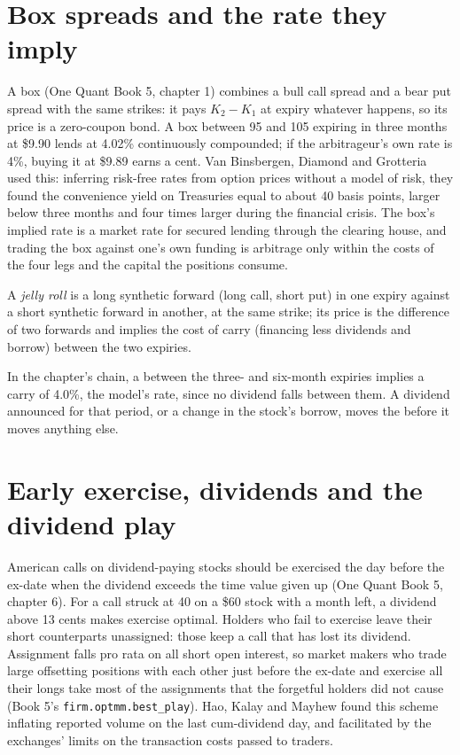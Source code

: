 \section{Box spreads and the rate they imply}

A box (One Quant Book 5, chapter 1) combines a bull call spread and a bear put spread with the same strikes: it pays $K_2-K_1$ at expiry whatever
happens, so its price is a zero-coupon bond. A box between 95 and 105 expiring in three months at \$9.90 lends at 4.02\% continuously compounded; if
the arbitrageur's own rate is 4\%, buying it at \$9.89 earns a cent. Van Binsbergen, Diamond and Grotteria used this: inferring risk-free rates from
option prices without a model of risk, they found the convenience yield on Treasuries equal to about 40 basis points, larger below three months and
four times larger during the financial crisis. The box's implied rate is a market rate for secured lending through the clearing house, and trading
the box against one's own funding is arbitrage only within the costs of the four legs and the capital the positions consume.

\begin{definition}\label{def:hf:options-cross-venue-and-volatility-arbitrage-at-speed:jelly}
A \emph{jelly roll} is a long synthetic forward (long call, short put) in one expiry against a short synthetic forward in another,
at the same strike; its price is the difference of two forwards and implies the cost of carry (financing less dividends and borrow) between the two
expiries.
\end{definition}

In the chapter's chain, a  between the three- and six-month expiries implies a carry of 4.0\%, the model's rate, since no dividend falls
between them. A dividend announced for that period, or a change in the stock's borrow, moves the  before it moves anything else.

\section{Early exercise, dividends and the dividend play}

American calls on dividend-paying stocks should be exercised the day before the ex-date when the dividend exceeds the time value given up (One Quant
Book 5, chapter 6). For a call struck at 40 on a \$60 stock with a month left, a dividend above 13 cents makes exercise optimal. Holders who fail to
exercise leave their short counterparts unassigned: those keep a call that has lost its dividend. Assignment falls pro rata on all short open
interest, so market makers who trade large offsetting positions with each other just before the ex-date and exercise all their longs take most of
the assignments that the forgetful holders did not cause (Book 5's \texttt{firm.optmm.best\_play}). Hao, Kalay and Mayhew found this scheme
inflating reported volume on the last cum-dividend day, and facilitated by the exchanges' limits on the transaction costs passed to traders.

